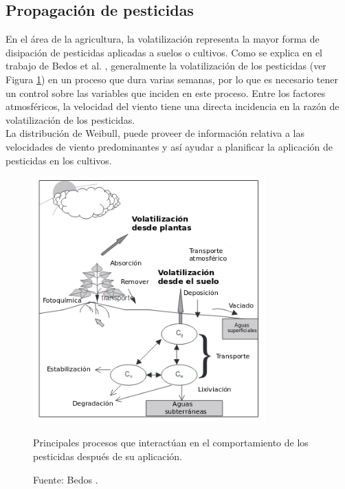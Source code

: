 \subsection{Propagación de pesticidas}
En el área de la agricultura, la volatilización representa la mayor forma de disipación de pesticidas aplicadas a suelos o cultivos. Como se explica en el trabajo de Bedos et al. \cite{Bedos01}, generalmente la volatilización de los pesticidas (ver Figura \ref{fig:ejemplo_pesticidas}) en un proceso que dura varias semanas, por lo que es necesario tener un control sobre las variables que inciden en este proceso. Entre los factores atmosféricos, la velocidad del viento tiene una directa incidencia en la razón de volatilización de los pesticidas.\\
La distribución de Weibull, puede proveer de información relativa a las velocidades de viento predominantes y así ayudar a planificar la aplicación de pesticidas en los cultivos.
\begin{figure}[ht!]
    \centering
    \captionsetup{justification=centering,margin=2cm}
        \includegraphics[width=0.8\textwidth]{figures/pesticide_wind.png} 
    \caption{Principales procesos que interactúan en el comportamiento de los pesticidas después de su aplicación.}
    \caption*{Fuente: Bedos \cite{Bedos01}.}
    \label{fig:ejemplo_pesticidas}
    
\end{figure}

